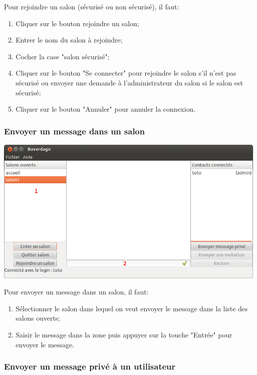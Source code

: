 \documentclass[a4paper,11pt,french]{book}
\begin{document}
Pour rejoindre un salon (sécurisé ou non sécurisé), il faut:

\begin{enumerate}
    \item Cliquer sur le bouton rejoindre un salon;
    \item Entrer le nom du salon à rejoindre;
    \item Cocher la case "salon sécurisé";
    \item Cliquer sur le bouton "Se connecter" pour rejoindre le salon s'il n'est pas sécurisé ou envoyer une demande à l'administrateur du salon si le salon est sécurisé;
    \item Cliquer sur le bouton "Annuler" pour annuler la connexion.
\end{enumerate}
\newpage

\subsubsection{Envoyer un message dans un salon}

\includegraphics[width=40em]{capture/mess_room.png}

Pour envoyer un message dans un salon, il faut:
\begin{enumerate}
    \item Sélectionner le salon dans lequel on veut envoyer le message dans la liste des salons ouverts;
    \item Saisir le message dans la zone puis appuyer sur la touche "Entrée" pour envoyer le message.
\end{enumerate}

\subsubsection{Envoyer un message privé à un utilisateur}
\end{document}
